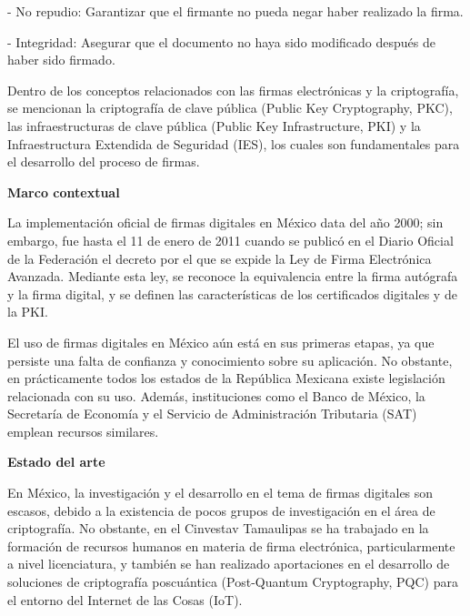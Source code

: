 \documentclass[a4paper,12pt]{article}
\begin{document}
{\small {\selectfont - No repudio: Garantizar que el firmante no pueda negar haber realizado la firma.}}

{\small {\selectfont - Integridad: Asegurar que el documento no haya sido modificado después de haber sido firmado.}}

{\small {\selectfont Dentro de los conceptos relacionados con las firmas electrónicas y la criptografía, se mencionan la criptografía de clave pública (Public Key Cryptography, PKC), las infraestructuras de clave pública (Public Key Infrastructure, PKI) y la Infraestructura Extendida de Seguridad (IES), los cuales son fundamentales para el desarrollo del proceso de firmas.}}



{\small {\selectfont \textbf{	Marco contextual}}}

{\small {\selectfont 	La implementación oficial de firmas digitales en México data del año 2000; sin embargo, fue hasta el 11 de enero de 2011 cuando se publicó en el Diario Oficial de la Federación el decreto por el que se expide la Ley de Firma Electrónica Avanzada. Mediante esta ley, se reconoce la equivalencia entre la firma autógrafa y la firma digital, y se definen las características de los certificados digitales y de la PKI.}}

{\small {\selectfont El uso de firmas digitales en México aún está en sus primeras etapas, ya que persiste una falta de confianza y conocimiento sobre su aplicación. No obstante, en prácticamente todos los estados de la República Mexicana existe legislación relacionada con su uso. Además, instituciones como el Banco de México, la Secretaría de Economía y el Servicio de Administración Tributaria (SAT) emplean recursos similares.}}



{\small {\selectfont \textbf{	Estado del arte}}}

{\small {\selectfont 	En México, la investigación y el desarrollo en el tema de firmas digitales son escasos, debido a la existencia de pocos grupos de investigación en el área de criptografía. No obstante, en el Cinvestav Tamaulipas se ha trabajado en la formación de recursos humanos en materia de firma electrónica, particularmente a nivel licenciatura, y también se han realizado aportaciones en el desarrollo de soluciones de criptografía poscuántica (Post-Quantum Cryptography, PQC) para el entorno del Internet de las Cosas (IoT).}}
\end{document}
